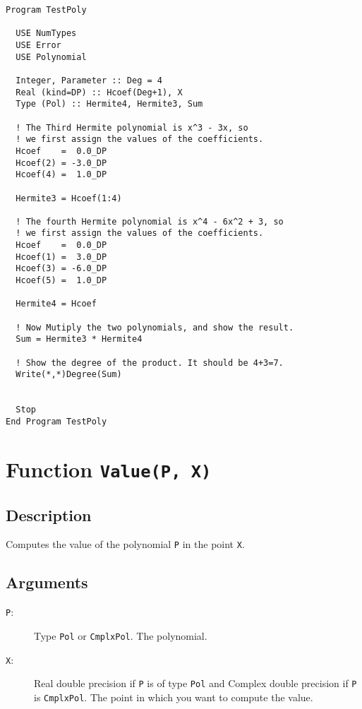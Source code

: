 \begin{lstlisting}[emph=Degree,
                   emphstyle=\color{blue},
                   frame=trBL,
                   caption=Returns the degree of a polynomial.,
                   label=degree]
Program TestPoly

  USE NumTypes
  USE Error
  USE Polynomial

  Integer, Parameter :: Deg = 4
  Real (kind=DP) :: Hcoef(Deg+1), X
  Type (Pol) :: Hermite4, Hermite3, Sum

  ! The Third Hermite polynomial is x^3 - 3x, so
  ! we first assign the values of the coefficients.
  Hcoef    =  0.0_DP
  Hcoef(2) = -3.0_DP
  Hcoef(4) =  1.0_DP

  Hermite3 = Hcoef(1:4)

  ! The fourth Hermite polynomial is x^4 - 6x^2 + 3, so
  ! we first assign the values of the coefficients.
  Hcoef    =  0.0_DP
  Hcoef(1) =  3.0_DP
  Hcoef(3) = -6.0_DP
  Hcoef(5) =  1.0_DP

  Hermite4 = Hcoef

  ! Now Mutiply the two polynomials, and show the result.
  Sum = Hermite3 * Hermite4

  ! Show the degree of the product. It should be 4+3=7.
  Write(*,*)Degree(Sum)


  Stop
End Program TestPoly
\end{lstlisting}


\section{Function \texttt{Value(P, X)}}

\subsection{Description}

Computes the value of the polynomial \texttt{P} in the point \texttt{X}.

\subsection{Arguments}

\begin{description}
\item[\texttt{P}:] Type \texttt{Pol} or \texttt{CmplxPol}. The polynomial.
\item[\texttt{X}:] Real double precision if \texttt{P} is of type
  \texttt{Pol} and Complex double precision if \texttt{P} is
  \texttt{CmplxPol}. The point in which you want to compute the value.
\end{description}

